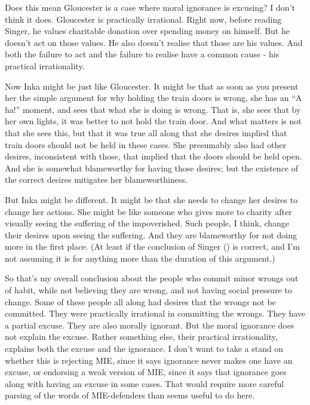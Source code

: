 \documentclass[
  10pt,
  letterpaper,
  twoside]{scrbook}
\begin{document}
Does this mean {Gloucester} is a case where moral ignorance is excusing?
I don't think it does. {Gloucester} is practically irrational. Right
now, before reading Singer, he values charitable donation over spending
money on himself. But he doesn't act on those values. He also doesn't
realise that those are his values. And both the failure to act and the
failure to realise have a common cause - his practical irrationality.

Now {Inka} might be just like {Gloucester}. It might be that as soon as
you present her the simple argument for why holding the train doors is
wrong, she has an ``A ha!'' moment, and sees that what she is doing is
wrong. That is, she sees that by her own lights, it was better to not
hold the train door. And what matters is not that she sees this, but
that it was true all along that she desires implied that train doors
should not be held in these cases. She presumably also had other
desires, inconsistent with those, that implied that the doors should be
held open. And she is somewhat blameworthy for having those desires; but
the existence of the correct desires mitigates her blameworthiness.

But {Inka} might be different. It might be that she needs to change her
desires to change her actions. She might be like someone who gives more
to charity after visually seeing the suffering of the impoverished. Such
people, I think, change their desires upon seeing the suffering. And
they are blameworthy for not doing more in the first place. (At least if
the conclusion of Singer () is correct,
and I'm not assuming it is for anything more than the duration of this
argument.)

So that's my overall conclusion about the people who commit minor wrongs
out of habit, while not believing they are wrong, and not having social
pressure to change. Some of these people all along had desires that the
wrongs not be committed. They were practically irrational in committing
the wrongs. They have a partial excuse. They are also morally ignorant.
But the moral ignorance does not explain the excuse. Rather something
else, their practical irrationality, explains both the excuse and the
ignorance. I don't want to take a stand on whether this is rejecting
MIE, since it says ignorance never makes one have an excuse, or
endorsing a weak version of MIE, since it says that ignorance goes along
with having an excuse in some cases. That would require more careful
parsing of the words of MIE-defenders than seems useful to do here.
\end{document}
